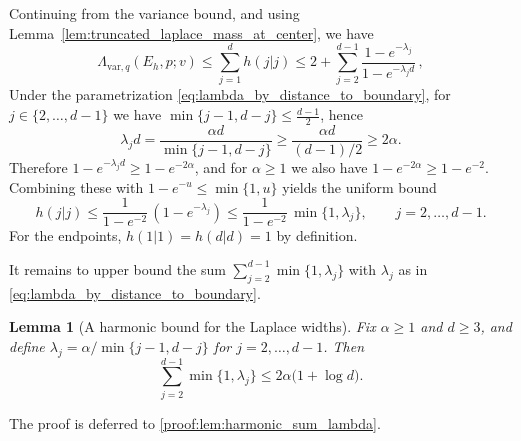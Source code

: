 \documentclass{article}
\theoremstyle{plain}
\newtheorem{lemma}[theorem]{Lemma}
\theoremstyle{definition}
\theoremstyle{plain}
\begin{document}
Continuing from the variance bound, and using Lemma~\ref{lem:truncated_laplace_mass_at_center}, we have
\[
    \Lambda_{\text{var}, q}(E_h, p; v)\le \sum_{j=1}^d h(j|j)
    \leq 2 + \sum_{j=2}^{d-1} \frac{1 - e^{-\lambda_j}}{1 - e^{-\lambda_j d}}\,,
\]
Under the parametrization \eqref{eq:lambda_by_distance_to_boundary}, for $j\in\{2,\ldots,d-1\}$ we have
$\min\{j-1,d-j\}\le \frac{d-1}{2}$, hence
\begin{equation}
    \lambda_j d
    = \frac{\alpha d}{\min\{j-1,d-j\}}
    \ge \frac{\alpha d}{(d-1)/2}
    \ge 2\alpha.
    \label{eq:lambda_d_lowerbound}
\end{equation}
Therefore $1-e^{-\lambda_j d}\ge 1-e^{-2\alpha}$, and for $\alpha\ge 1$ we also have
$1-e^{-2\alpha}\ge 1-e^{-2}$.
Combining these with $1-e^{-u}\le \min\{1,u\}$ yields the uniform bound
\begin{equation}
    h(j|j)
    \le \frac{1}{1-e^{-2}}\,(1-e^{-\lambda_j})
    \le \frac{1}{1-e^{-2}}\,\min\{1,\lambda_j\},
    \qquad j=2,\ldots,d-1.
    \label{eq:center_mass_bound_simple}
\end{equation}
For the endpoints, $h(1|1)=h(d|d)=1$ by definition.

It remains to upper bound the sum $\sum_{j=2}^{d-1}\min\{1,\lambda_j\}$ with $\lambda_j$ as in \eqref{eq:lambda_by_distance_to_boundary}.

\begin{lemma}[A harmonic bound for the Laplace widths]
    \label{lem:harmonic_sum_lambda}
    Fix $\alpha\ge 1$ and $d\ge 3$, and define $\lambda_j=\alpha/\min\{j-1,d-j\}$ for $j=2,\ldots,d-1$.
    Then
    \begin{equation}
        \sum_{j=2}^{d-1}\min\{1,\lambda_j\}
        \le 2\alpha\bigl(1+\log d\bigr).
        \label{eq:harmonic_sum_lambda}
    \end{equation}
\end{lemma}
\noindent The proof is deferred to \ref{proof:lem:harmonic_sum_lambda}.
\end{document}
